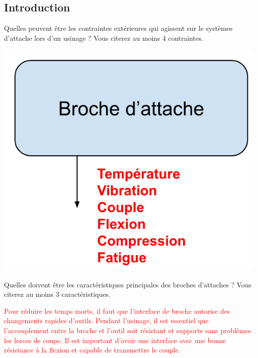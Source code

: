 \documentclass[12pt,a4paper]{article} %
\begin{document}
\subsection{Introduction}

\begin{exo} Quelles peuvent être les contraintes extérieures qui agissent sur le systèmes d'attache lors d'un usinage ? Vous citerez au moins 4 contraintes.\end{exo}
\begin{center}
\includegraphics[scale=0.8]{CORR3.png}
\end{center}

\begin{exo} Quelles doivent être les caractéristiques principales des broches d'attaches ? Vous citerez au moins 3 caractéristiques.\end{exo}

\textcolor{red}{Pour réduire les temps morts, il faut que l'interface de broche autorise des changements rapides d'outils. Pendant l'usinage, il est essentiel que l'accouplement entre la broche et l'outil soit résistant et supporte sans problèmes les forces de coupe. Il est important d'avoir une interface avec une bonne résistance à la flexion et capable de transmettre le couple.}
\end{document}

